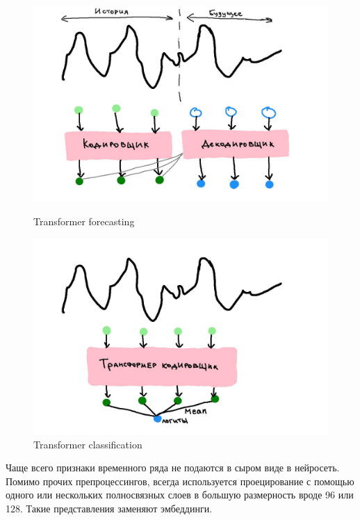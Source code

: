 \documentclass[12pt,fleqn]{article}
\begin{document}
\begin{figure}[!htb]
    \centering
    \begin{minipage}{0.45\linewidth}
        \centering
        \includegraphics[width=\linewidth]{illustrations/transformer-forecasting.jpg}
        \caption{Transformer forecasting}
        \label{fig:transformer-forecasting}
    \end{minipage}
    \begin{minipage}{0.45\linewidth}
        \centering
        \includegraphics[width=\linewidth]{illustrations/transformer-clf.jpg}
        \caption{Transformer classification}
        \label{fig:transformer-classification}
    \end{minipage}
\end{figure}


Чаще всего признаки временного ряда не подаются в сыром виде в нейросеть. Помимо прочих препроцессингов, всегда используется проецирование с помощью одного или нескольких полносвязных слоев в большую размерность вроде 96 или 128. Такие представления заменяют эмбеддинги.
\end{document}
